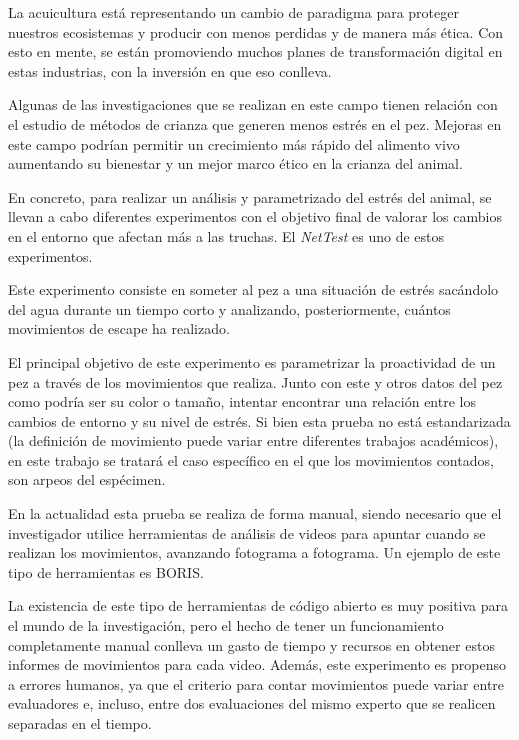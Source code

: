 La acuicultura está representando un cambio de paradigma para proteger nuestros ecosistemas y producir con menos perdidas y de manera más ética. Con esto en mente, se están 
promoviendo muchos planes de transformación digital en estas industrias, con la inversión en  que eso conlleva.

Algunas de las investigaciones que se realizan en este campo tienen relación con el estudio de métodos de crianza que generen menos estrés en el pez. Mejoras en este campo podrían 
permitir un crecimiento más rápido del alimento vivo aumentando su bienestar y un mejor marco ético en la crianza del animal.

En concreto, para realizar un análisis y parametrizado del estrés del animal, se llevan a cabo diferentes experimentos con el objetivo final de valorar los cambios en el entorno que afectan más a las truchas. 
El \textit{NetTest}\cite{barriossanchezPruebaRedEvaluando2023} es uno de estos experimentos.

Este experimento consiste en someter al pez a una situación de estrés sacándolo del agua durante un tiempo corto y analizando, posteriormente, cuántos movimientos de escape ha realizado.

El principal objetivo de este experimento es parametrizar la proactividad de un pez a través de los movimientos que realiza. Junto con este y otros datos del pez como podría ser su color o tamaño, 
intentar encontrar una relación entre los cambios de entorno y su nivel de estrés. Si bien esta prueba no está estandarizada (la definición de movimiento puede variar entre diferentes 
trabajos académicos), en este trabajo se tratará el caso específico en el que los movimientos contados, son arpeos del espécimen.

En la actualidad esta prueba se realiza de forma manual, siendo necesario que el investigador utilice herramientas de análisis de videos para apuntar cuando se realizan los movimientos, 
avanzando fotograma a fotograma. Un ejemplo de este tipo de herramientas es BORIS\cite{friardBORISFreeVersatile2016}.

La existencia de este tipo de herramientas de código abierto es muy positiva para el mundo de la investigación, pero el hecho de tener un funcionamiento completamente manual conlleva un gasto 
de tiempo y recursos en obtener estos informes de movimientos para cada video. Además, este experimento es propenso a errores humanos, ya que el criterio para contar movimientos puede variar entre 
evaluadores e, incluso, entre dos evaluaciones del mismo experto que se realicen separadas en el tiempo.

